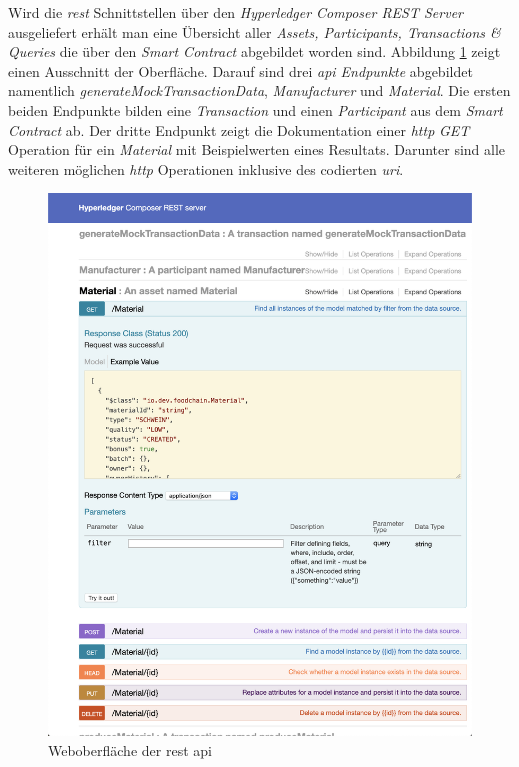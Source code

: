 Wird die \textit{\ac{rest}} Schnittstellen über den \textit{Hyperledger Composer REST Server} ausgeliefert erhält man eine Übersicht aller \textit{Assets, Participants, Transactions \& Queries} die über den \textit{Smart Contract} abgebildet worden sind. Abbildung \ref{fig:rest-api-explorer} zeigt einen Ausschnitt der Oberfläche. Darauf sind drei \textit{\ac{api} Endpunkte} abgebildet namentlich \textit{generateMockTransactionData}, \textit{Manufacturer} und \textit{Material}. Die ersten beiden Endpunkte bilden eine \textit{Transaction} und einen \textit{Participant} aus dem \textit{Smart Contract} ab. Der dritte Endpunkt zeigt die Dokumentation einer \textit{\ac{http}} \textit{GET} Operation für ein \textit{Material} mit Beispielwerten eines Resultats. Darunter sind alle weiteren möglichen \textit{\ac{http}} Operationen inklusive des codierten \textit{\ac{uri}}.

\begin{figure}[H]
	\centering
	\includegraphics[width=1\linewidth]{pictures/rest-api-explorer}
	\caption[Weboberfläche der \acs{rest} \acs{api}]{Weboberfläche der \ac{rest} \ac{api}}
	\label{fig:rest-api-explorer}
\end{figure}

